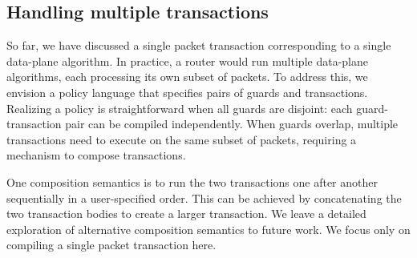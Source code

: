 \subsection{Handling multiple transactions}
\label{ss:multiple}
So far, we have discussed a single packet transaction corresponding to a single
data-plane algorithm. In practice, a router would run multiple data-plane
algorithms, each processing its own subset of packets. To address this, we
envision a policy language that specifies pairs of guards and transactions.
Realizing a policy is straightforward when all guards are disjoint: each
guard-transaction pair can be compiled independently. When guards overlap,
multiple transactions need to execute on the same subset of packets, requiring
a mechanism to compose transactions.

One composition semantics is to run the two transactions one after another
sequentially in a user-specified order. This can be achieved by concatenating
the two transaction bodies to create a larger transaction.  We leave a detailed
exploration of alternative composition semantics to future work.  We focus only
on compiling a single packet transaction here.
